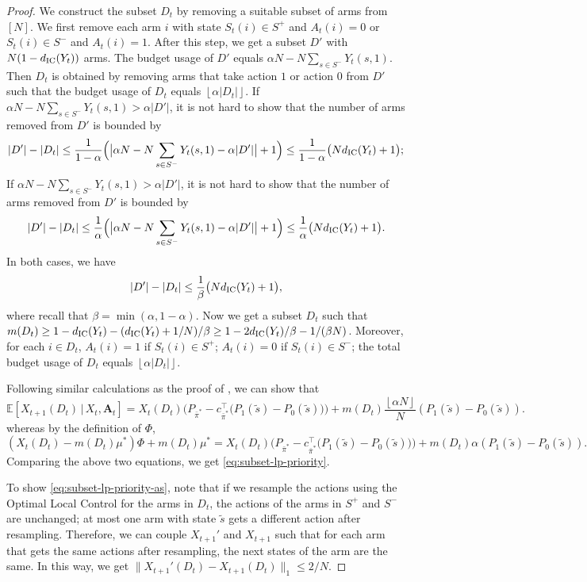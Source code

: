 \documentclass[11pt,letterpaper]{article}
\theoremstyle{plain}
\theoremstyle{definition}
\theoremstyle{remark}
\newcommand{\normplain}[1]{\lVert#1\rVert}
\newcommand{\E}[1]{\mathbb{E}\left[#1\right]}
\newcommand{\givenplain}{\,|\,}
\newcommand{\absbig}[1]{\big\lvert#1\big\rvert}
\newcommand{\floor}[1]{\left\lfloor#1\right\rfloor}
\newcommand{\ve}[1]{\bm{#1}}
\newcommand{\veA}{\ve{A}}
\newcommand{\pibar}{{\sysbar{\pi}}}
\newcommand{\pibs}{{\pibar^*}}
\newcommand{\sysbar}[1]{\bar{#1}}
\newcommand{\costvec}{c_\pibs}
\newcommand{\statdist}{\mu^*}
\newcommand{\sneu}{\tilde{s}}
\newcommand{\disy}{d_{\textup{IC}}}
\begin{document}
\begin{proof}%
    We construct the subset $D_t$ by removing a suitable subset of arms from $[N]$. 
    We first remove each arm $i$ with state $S_t(i)\in S^+$ and $A_t(i) = 0$ or $S_t(i) \in S^-$ and $A_t(i) = 1$. After this step, we get a subset $D'$ with $N(1-\disy(Y_t))$ arms. The budget usage of $D'$ equals $\alpha N - N \sum_{s\in S^-} Y_t(s,1)$. 
    Then $D_t$ is obtained by removing arms that take action $1$ or action $0$ from $D'$ such that the budget usage of $D_t$ equals $\floor{\alpha |D_t|}$.
    If $\alpha N - N \sum_{s\in S^-} Y_t(s,1)  > \alpha |D'|$, it is not hard to show that the number of arms removed from $D'$ is bounded by 
    \[
        |D'| - |D_t|  \leq \frac{1}{1-\alpha} \Big(\absbig{\alpha N - N \sum_{s\in S^-} Y_t(s,1) - \alpha |D'| }  + 1\Big) \leq  \frac{1}{1-\alpha} \big(N\disy(Y_t) + 1\big); 
    \]
    If $\alpha N - N \sum_{s\in S^-} Y_t(s,1)  > \alpha |D'|$, it is not hard to show that the number of arms removed from $D'$ is bounded by 
    \[
         |D'| - |D_t| \leq \frac{1}{\alpha} \Big(\absbig{\alpha N - N \sum_{s\in S^-} Y_t(s,1) - \alpha |D'|}  + 1\Big) \leq  \frac{1}{\alpha} \big(N\disy(Y_t) + 1\big).
    \]
    In both cases, we have 
    \begin{equation}
        |D'| - |D_t|  \leq \frac{1}{\beta}\big(N\disy(Y_t) + 1\big),
    \end{equation}
    where recall that $\beta = \min(\alpha, 1-\alpha)$. 
    Now we get a subset $D_t$ such that $m(D_t) \geq 1 - \disy(Y_t)- (\disy(Y_t)+ 1/N) / \beta \geq 1-2\disy(Y_t)/\beta - 1/(\beta N)$. Moreover, for each $i\in D_t$, $A_t(i) = 1$ if $S_t(i) \in S^+$; $A_t(i) = 0$ if $S_t(i) \in S^-$; the total budget usage of $D_t$ equals $\floor{\alpha |D_t|}$. 

    Following similar calculations as the proof of , we can show that 
    \[
        \E{X_{t+1}(D_t) \givenplain X_t, \veA_t} 
        = X_t(D_t) \Big(P_\pibs - \costvec^\top \big(P_1(\sneu) - P_0(\sneu)\big) \Big) + m(D_t) \frac{\floor{\alpha N}}{N} (P_1(\sneu) - P_0(\sneu)).
    \]
    whereas by the definition of $\Phi$,  
    \[
        (X_t(D_t) - m(D_t)\statdist) \Phi + m(D_t) \statdist = X_t(D_t) \Big(P_\pibs - \costvec^\top \big(P_1(\sneu) - P_0(\sneu)\big) \Big) + m(D_t) \alpha (P_1(\sneu) - P_0(\sneu)).
    \]
    Comparing the above two equations, we get \eqref{eq:subset-lp-priority}.

    To show \eqref{eq:subset-lp-priority-as}, note that if we resample the actions using the Optimal Local Control for the arms in $D_t$, 
    the actions of the arms in $S^+$ and $S^-$ are unchanged; at most one arm with state $\sneu$ gets a different action after resampling. 
    Therefore, we can couple $X_{t+1}'$ and $X_{t+1}$ such that for each arm that gets the same actions after resampling, the next states of the arm are the same. In this way, we get $\normplain{X_{t+1}'(D_t) - X_{t+1}(D_t)}_1 \leq 2/N$. 
\end{proof}
\end{document}
